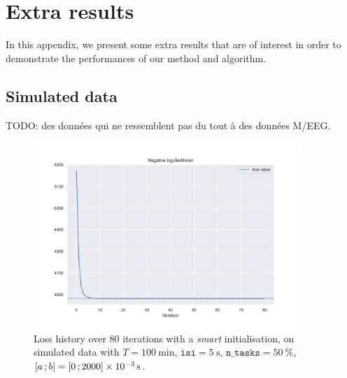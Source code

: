 \section{Extra results}\label{annexe:extra_results}

In this appendix, we present some extra results that are of interest in order to demonstrate the performances of our method and algorithm.

\subsection{Simulated data}\label{annexe:extra_results_simulated}

TODO: des données qui ne ressemblent pas du tout à des données M/EEG.

\begin{figure}[h!]
    \centering
    \includegraphics[width=0.9\textwidth]{pics/results/history_loss_2.pdf}
    \caption{Loss history over 80 iterations with a \textit{smart} initialisation, on simulated data with $T = \SI{100}{\minute}$, $\texttt{isi}=\SI{5}{\second}$, $\texttt{n\_tasks} = \SI{50}{\percent}$, $\left[ a \, ; b \right] = \left[ 0 \, ; 2000 \right]\times \SI{e-3}{\second}$.}
    \label{fig:history_loss_2}
\end{figure}

